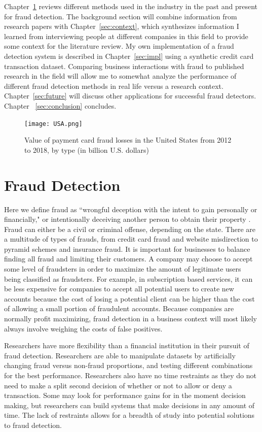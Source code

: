 \documentclass[midd]{thesis}
\begin{document}
Chapter~\ref{sec:background} reviews different methods used in the industry in the past and present for fraud detection. The background section will combine information from research papers with Chapter~\ref{sec:context}, which synthesizes information I learned from interviewing people at different companies in this field to provide some context for the literature review. My own implementation of a fraud detection system is described in Chapter~\ref{sec:impl} using a synthetic credit card transaction dataset. Comparing business interactions with fraud to published research in the field will allow me to somewhat analyze the performance of different fraud detection methods in real life versus a research context. Chapter~\ref{sec:future} will discuss other applications for successful fraud detectors. Chapter ~\ref{sec:conclusion} concludes.

\begin{figure}
  \texttt{[image: USA.png]}
  \caption{Value of payment card fraud losses in the United States from 2012 to 2018, by type (in billion U.S. dollars) \cite{USA}}
  \label{fig:USA}
\end{figure}


\pagebreak

\chapter{Fraud Detection}
\label{sec:background}

Here we define fraud as ``wrongful deception with the intent to gain personally or financially," or intentionally deceiving another person to obtain their property \cite{legaldict}. Fraud can either be a civil or criminal offense, depending on the state. There are a multitude of types of frauds, from credit card fraud and website misdirection to pyramid schemes and insurance fraud. It is important for businesses to balance finding all fraud and limiting their customers. A company may choose to accept some level of fraudsters in order to maximize the amount of legitimate users being classified as fraudsters. For example, in subscription based services, it can be less expensive for companies to accept all potential users to create new accounts because the cost of losing a potential client can be higher than the cost of allowing a small portion of fraudulent accounts. Because companies are normally profit maximizing, fraud detection in a business context will most likely always involve weighing the costs of false positives.

Researchers have more flexibility than a financial institution in their pursuit of fraud detection. Researchers are able to manipulate datasets by artificially changing fraud versus non-fraud proportions, and testing different combinations for the best performance. Researchers also have no time restraints as they do not need to make a split second decision of whether or not to allow or deny a transaction. Some may look for performance gains for in the moment decision making, but researchers can build systems that make decisions in any amount of time. The lack of restraints allows for a breadth of study into potential solutions to fraud detection. 
\end{document}

